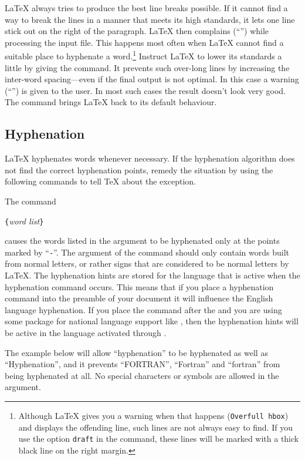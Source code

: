 \LaTeX{} always tries to produce the best line breaks possible. If it
cannot find a way to break the lines in a manner that meets its high
standards, it lets one line stick out on the right of the paragraph.
\LaTeX{} then complains (``'') while processing the
input file. This happens most often when \LaTeX{} cannot find a
suitable place to hyphenate a word.\footnote{Although \LaTeX{} gives
  you a warning when that happens (\texttt{Overfull \bs{}hbox}) and displays the
  offending line, such lines are not always easy to find. If you use
  the option \texttt{draft} in the  command, these
  lines will be marked with a thick black line on the right margin.}
Instruct \LaTeX{} to lower its standards a little by giving
the  command. It prevents such over-long lines by
increasing the inter-word spacing---even if the final output is not
optimal.  In this case a warning (``'') is given to
the user.  In most such cases the result doesn't look very good. The
command  brings \LaTeX{} back to its default behaviour.

\subsection{Hyphenation} \label{hyph}

\LaTeX{} hyphenates words whenever necessary. If the hyphenation
algorithm does not find the correct hyphenation points,
remedy the situation by using the following commands to tell \TeX{}
about the exception.

The command
\begin{lscommand}
\verb|{|\emph{word list}\verb|}|
\end{lscommand}
\noindent causes the words listed in the argument to be hyphenated only at
the points marked by ``\verb|-|''.  The argument of the command should only
contain words built from normal letters, or rather signs that are considered
to be normal letters by \LaTeX{}. The hyphenation hints are
stored for the language that is active when the hyphenation command
occurs. This means that if you place a hyphenation command into the preamble
of your document it will influence the English language hyphenation. If you
place the command after the \verb|| and you are using some
package for national language support like , then the hyphenation
hints will be active in the language activated through .

The example below will allow ``hyphenation'' to be hyphenated as well as
``Hyphenation'', and it prevents ``FORTRAN'', ``Fortran'' and ``fortran''
from being hyphenated at all.  No special characters or symbols are allowed
in the argument.

